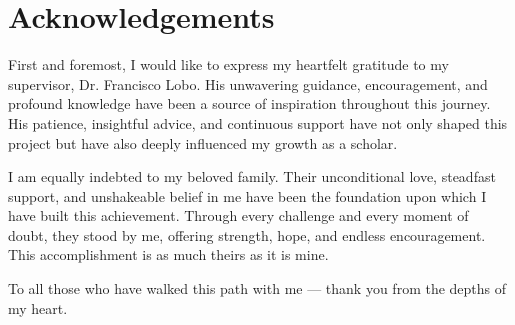 \section*{Acknowledgements}

First and foremost, I would like to express my heartfelt gratitude to my supervisor, Dr. Francisco Lobo. His unwavering guidance, encouragement, and profound knowledge have been a source of inspiration throughout this journey. His patience, insightful advice, and continuous support have not only shaped this project but have also deeply influenced my growth as a scholar.

I am equally indebted to my beloved family. Their unconditional love, steadfast support, and unshakeable belief in me have been the foundation upon which I have built this achievement. Through every challenge and every moment of doubt, they stood by me, offering strength, hope, and endless encouragement. This accomplishment is as much theirs as it is mine.

To all those who have walked this path with me — thank you from the depths of my heart.
